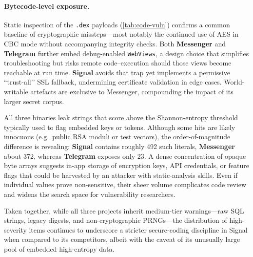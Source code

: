 \documentclass[a4paper,12pt]{report}
\begin{document}
\paragraph{Bytecode‐level exposure.}%
Static inspection of the \texttt{.dex} payloads (\autoref{tab:code-vuln}) confirms
a common baseline of cryptographic missteps—most notably the continued use of
AES in CBC mode without accompanying integrity checks.
Both \textbf{Messenger} and \textbf{Telegram} further embed debug-enabled
\texttt{WebViews}, a design choice that simplifies troubleshooting but risks
remote code–execution should those views become reachable at run time.
\textbf{Signal} avoids that trap yet implements a permissive “trust-all’’ SSL
fallback, undermining certificate validation in edge cases. World-writable
artefacts are exclusive to Messenger, compounding the impact of its larger
secret corpus.

All three binaries leak strings that
score above the Shannon-entropy threshold typically used to flag embedded keys
or tokens. Although some hits are likely innocuous (e.g.\ public RSA
moduli or test vectors), the order-of-magnitude difference is revealing:
\textbf{Signal} contains roughly \num{492} such literals, \textbf{Messenger}
about \num{372}, whereas \textbf{Telegram} exposes only \num{23}. A dense
concentration of opaque byte arrays suggests in-app storage of encryption keys,
API credentials, or feature flags that could be harvested by an attacker with
static-analysis skills. Even if individual values prove non-sensitive, their
sheer volume complicates code review and widens the search space for
vulnerability researchers.

Taken together, while all three projects inherit medium-tier warnings—raw SQL
strings, legacy digests, and non-cryptographic PRNGs—the distribution of
high-severity items continues to underscore a stricter secure-coding discipline
in Signal when compared to its competitors, albeit with the caveat of its
unusually large pool of embedded high-entropy data.
\end{document}
